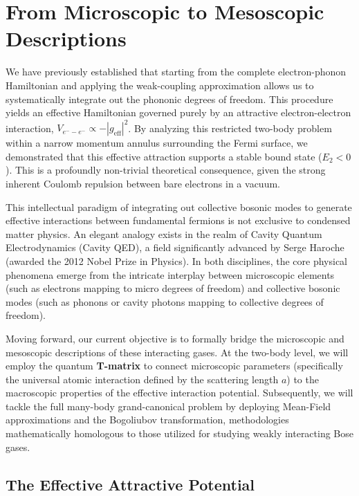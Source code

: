 \section{From Microscopic to Mesoscopic Descriptions}

We have previously established that starting from the complete electron-phonon Hamiltonian and applying the weak-coupling approximation allows us to systematically integrate out the phononic degrees of freedom. This procedure yields an effective Hamiltonian governed purely by an attractive electron-electron interaction, \( V_{e^--e^-} \propto -|g_{\text{eff}}|^2 \). By analyzing this restricted two-body problem within a narrow momentum annulus surrounding the Fermi surface, we demonstrated that this effective attraction supports a stable bound state (\( E_2 < 0 \)). This is a profoundly non-trivial theoretical consequence, given the strong inherent Coulomb repulsion between bare electrons in a vacuum.

\begin{remark}
    This intellectual paradigm of integrating out collective bosonic modes to generate effective interactions between fundamental fermions is not exclusive to condensed matter physics. An elegant analogy exists in the realm of Cavity Quantum Electrodynamics (Cavity QED), a field significantly advanced by Serge Haroche (awarded the 2012 Nobel Prize in Physics). In both disciplines, the core physical phenomena emerge from the intricate interplay between microscopic elements (such as electrons mapping to micro degrees of freedom) and collective bosonic modes (such as phonons or cavity photons mapping to collective degrees of freedom).
\end{remark}

Moving forward, our current objective is to formally bridge the microscopic and mesoscopic descriptions of these interacting gases. At the two-body level, we will employ the quantum \textbf{T-matrix} to connect microscopic parameters (specifically the universal atomic interaction defined by the scattering length \( a \)) to the macroscopic properties of the effective interaction potential. Subsequently, we will tackle the full many-body grand-canonical problem by deploying Mean-Field approximations and the Bogoliubov transformation, methodologies mathematically homologous to those utilized for studying weakly interacting Bose gases.

\subsection{The Effective Attractive Potential}

